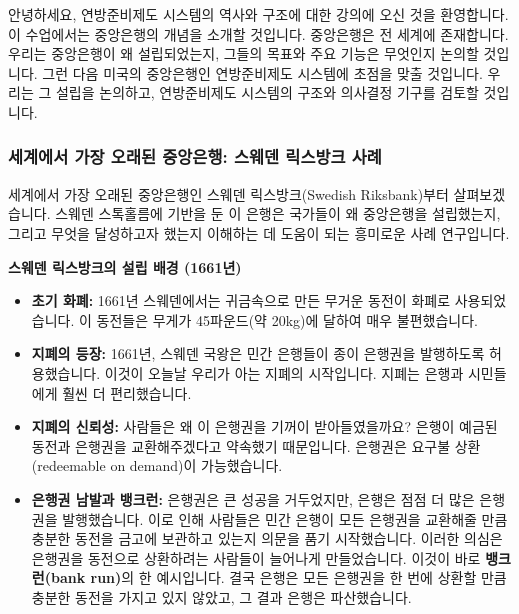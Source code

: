 \documentclass[11pt,a4paper]{article}
\theoremstyle{definition}
\begin{document}
안녕하세요, 연방준비제도 시스템의 역사와 구조에 대한 강의에 오신 것을 환영합니다. 이 수업에서는 중앙은행의 개념을 소개할 것입니다. 중앙은행은 전 세계에 존재합니다. 우리는 중앙은행이 왜 설립되었는지, 그들의 목표와 주요 기능은 무엇인지 논의할 것입니다. 그런 다음 미국의 중앙은행인 연방준비제도 시스템에 초점을 맞출 것입니다. 우리는 그 설립을 논의하고, 연방준비제도 시스템의 구조와 의사결정 기구를 검토할 것입니다.

\vspace{1em}

\subsubsection*{세계에서 가장 오래된 중앙은행: 스웨덴 릭스방크 사례}
세계에서 가장 오래된 중앙은행인 스웨덴 릭스방크(Swedish Riksbank)부터 살펴보겠습니다. 스웨덴 스톡홀름에 기반을 둔 이 은행은 국가들이 왜 중앙은행을 설립했는지, 그리고 무엇을 달성하고자 했는지 이해하는 데 도움이 되는 흥미로운 사례 연구입니다.

\begin{examplebox}
\textbf{스웨덴 릭스방크의 설립 배경 (1661년)}
\begin{itemize}
    \item \textbf{초기 화폐:} 1661년 스웨덴에서는 귀금속으로 만든 무거운 동전이 화폐로 사용되었습니다. 이 동전들은 무게가 45파운드(약 20kg)에 달하여 매우 불편했습니다.
    \item \textbf{지폐의 등장:} 1661년, 스웨덴 국왕은 민간 은행들이 종이 은행권을 발행하도록 허용했습니다. 이것이 오늘날 우리가 아는 지폐의 시작입니다. 지폐는 은행과 시민들에게 훨씬 더 편리했습니다.
    \item \textbf{지폐의 신뢰성:} 사람들은 왜 이 은행권을 기꺼이 받아들였을까요? 은행이 예금된 동전과 은행권을 교환해주겠다고 약속했기 때문입니다. 은행권은 요구불 상환(redeemable on demand)이 가능했습니다.
    \item \textbf{은행권 남발과 뱅크런:} 은행권은 큰 성공을 거두었지만, 은행은 점점 더 많은 은행권을 발행했습니다. 이로 인해 사람들은 민간 은행이 모든 은행권을 교환해줄 만큼 충분한 동전을 금고에 보관하고 있는지 의문을 품기 시작했습니다. 이러한 의심은 은행권을 동전으로 상환하려는 사람들이 늘어나게 만들었습니다. 이것이 바로 \textbf{뱅크런(bank run)}의 한 예시입니다. 결국 은행은 모든 은행권을 한 번에 상환할 만큼 충분한 동전을 가지고 있지 않았고, 그 결과 은행은 파산했습니다.
\end{itemize}
\end{examplebox}

\vspace{1em}
\end{document}
